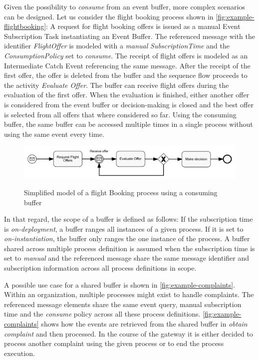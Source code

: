 Given the possibility to \textit{consume} from an event buffer, more complex scenarios can be designed.
Let us consider the flight booking process shown in \autoref{fig:example-flightbooking}: A request for flight booking offers is issued as a manual Event Subscription Task instantiating an Event Buffer. The referenced message with the identifier \textit{FlightOffer} is modeled with a \textit{manual} \textit{SubscriptionTime} and the \textit{ConsumptionPolicy} set to \textit{consume}.
The receipt of flight offers is modeled as an Intermediate Catch Event referencing the same message. After the receipt of the first offer, the offer is deleted from the buffer and the sequence flow proceeds to the activity \textit{Evaluate Offer}.
The buffer can receive flight offers during the evaluation of the first offer.
When the evaluation is finished, either another offer is considered from the event buffer or decision-making is closed and the best offer is selected from all offers that where considered so far.
Using the consuming buffer, the same buffer can be accessed multiple times in a single process without using the same event every time.

\begin{figure}[]
	\myfloatalign
	{\includegraphics[width=1\linewidth]{chapters/concept/bpmnx/FlightBooking.png}}
	\caption{Simplified model of a flight Booking process using a consuming buffer}\label{fig:example-flightbooking}
\end{figure}

In that regard, the scope of a buffer is defined as follows: If the subscription time is \textit{on-deployment}, a buffer ranges all instances of a given process. If it is set to \textit{on-instantiation}, the buffer only ranges the one instance of the process. A buffer shared across multiple process definition is assumed when the subscription time is set to \textit{manual} and the referenced message share the same message identifier and subscription information across all process definitions in scope.

A possible use case for a shared buffer is shown in \autoref{fig:example-complaints}. Within an organization, multiple processes might exist to handle complaints. The referenced message elements share the same event query, manual subscription time and the \textit{consume} policy across all these process definitions. \autoref{fig:example-complaints} shows how the events are retrieved from the shared buffer in \textit{obtain complaint} and then processed. In the course of the gateway it is either decided to process another complaint using the given process or to end the process execution.

